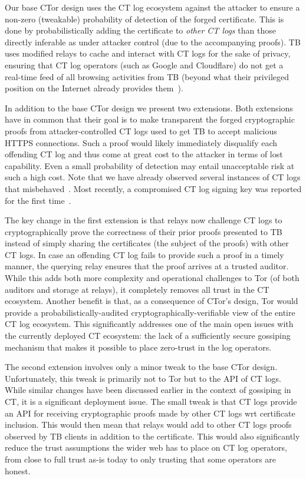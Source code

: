 Our base CTor design uses the CT log ecosystem against the attacker to ensure a
non-zero (tweakable) probability of detection of the forged certificate. This is
done by probabilistically adding the certificate to \emph{other CT logs} than
those directly inferable as under attacker control (due to the accompanying
proofs). TB uses modified relays to cache and interact with CT logs for the sake
of privacy, ensuring that CT log operators (such as Google and Cloudflare) do
not get a real-time feed of all browsing activities from TB (beyond what their
privileged position on the Internet already provides
them~\cite{1mtrack,TorDNS}). 

In addition to the base CTor design we present two extensions. Both extensions
have in common that their goal is to make transparent the forged cryptographic
proofs from attacker-controlled CT logs used to get TB to accept malicious HTTPS
connections. Such a proof would likely immediately disqualify each offending CT
log and thus come at great cost to the attacker in terms of lost capability.
Even a small probability of detection may entail unacceptable risk at such a
high cost. Note that we have already observed several instances of CT logs that
misbehaved~\cite{izenpe-disqualified,venafi-disqualified,gdca1-omission}. Most
recently, a compromised CT log signing key was reported for the first
time~\cite{digicert-log-compromised}. 

The key change in the first extension is that relays now challenge CT logs to
cryptographically prove the correctness of their prior proofs presented to TB
instead of simply sharing the certificates (the subject of the proofs) with
other CT logs. In case an offending CT log fails to provide such a proof
in a timely manner,
the querying relay ensures that the proof arrives at a trusted auditor. While
this adds both more complexity and operational challenges to Tor (of both
auditors and storage at relays), it completely removes all trust in the CT
ecosystem. Another benefit is that, as a consequence of CTor's design, Tor would
provide a probabilistically-audited cryptographically-verifiable view of the
entire CT log ecosystem. This significantly addresses one of the main open
issues with the currently deployed CT ecosystem: the lack of a sufficiently
secure gossiping mechanism that makes it possible to place zero-trust in the log
operators.

The second extension involves only a minor tweak to the base CTor design.
Unfortunately, this tweak is primarily not to Tor but to the API of CT logs.
While similar changes have been discussed earlier in the context of gossiping in
CT, it is a significant deployment issue. The small tweak is that CT logs
provide an API for receiving cryptographic proofs made by other CT logs wrt
certificate inclusion. This would then mean that relays would add to
other CT logs proofs observed by TB clients in addition to the certificate.
This would also significantly reduce the trust assumptions the wider web has to
place on CT log operators, from close to full trust as-is today to only trusting
that some operators are honest.

